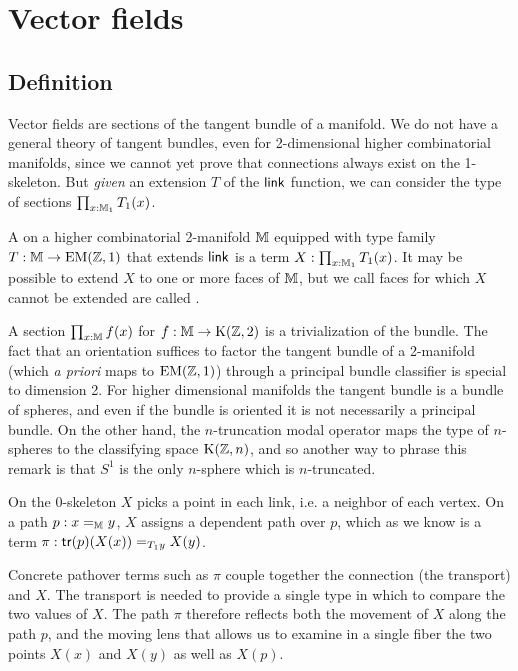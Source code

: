\section{Vector fields}
\subsection{Definition}
Vector fields are sections of the tangent bundle of a manifold. We do not have a general theory of tangent bundles, even for 2-dimensional higher combinatorial manifolds, since we cannot yet prove that connections always exist on the 1-skeleton. But \emph{given} an extension \( T \) of the \( \operatorname{\mathsf{link}} \) function, we can consider the type of sections \( \prod_{x:\mathbb{M}_1}T_1(x) \).

\begin{mydef}
A  on a higher combinatorial 2-manifold \( \mathbb{M} \) equipped with type family \( T:\mathbb{M}\to\mathrm{EM}(\mathbb{Z},1) \) that extends \( \operatorname{\mathsf{link}} \) is a term \( X:\prod_{x:\mathbb{M}_1}T_1(x) \). It may be possible to extend \( X \) to one or more faces of \( \mathbb{M} \), but we call faces for which \( X \) cannot be extended are called .
\end{mydef}

\begin{mynote}
A section \( \prod_{x:\mathbb{M}}f(x) \) for \( f:\mathbb{M}\to\mathrm{K}(\mathbb{Z},2) \) is a trivialization of the bundle. The fact that an orientation suffices to factor the tangent bundle of a 2-manifold (which \emph{a priori} maps to \( \mathrm{EM}(\mathbb{Z},1) \)) through a principal bundle classifier is special to dimension 2. For higher dimensional manifolds the tangent bundle is a bundle of spheres, and even if the bundle is oriented it is not necessarily a principal bundle. On the other hand, the \( n \)-truncation modal operator maps the type of \( n \)-spheres to the classifying space \( \mathrm{K}(\mathbb{Z},n) \), and so another way to phrase this remark is that \( S^1 \) is the only \( n \)-sphere which is \( n \)-truncated.
\end{mynote}

On the 0-skeleton \( X \) picks a point in each link, i.e. a neighbor of each vertex. On a path \( p:x=_{\mathbb{M}} y \), \( X \) assigns a dependent path over \( p \), which as we know is a term \( \pi:\mathsf{tr}(p)(X(x))=_{T_1 y} X(y) \).

\begin{mynote}Concrete pathover terms such as \( \pi \) couple together the connection (the transport) and \( X \). The transport is needed to provide a single type in which to compare the two values of \( X \). The path \( \pi \) therefore reflects both the movement of \( X \) along the path \( p \), and the moving lens that allows us to examine in a single fiber the two points \( X(x) \) and \( X(y) \) as well as \( X(p) \).\end{mynote}

